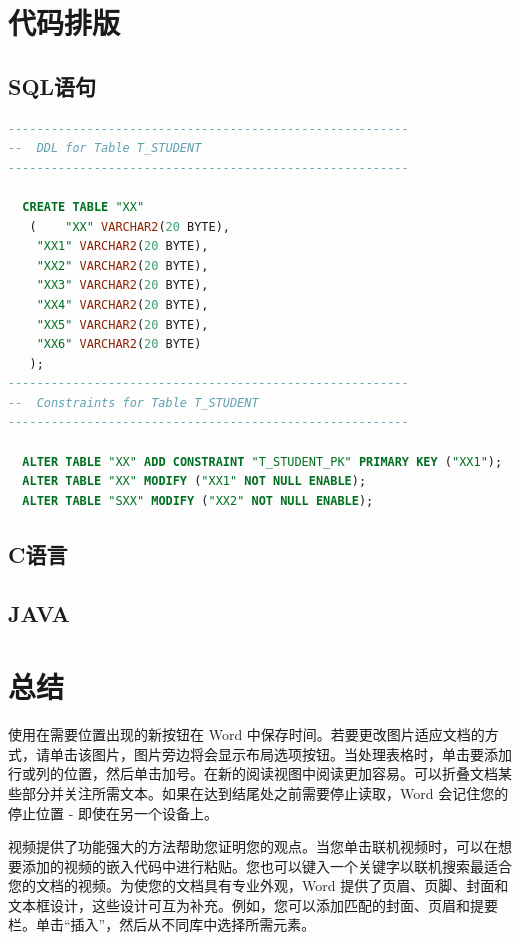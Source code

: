 \documentclass[fontset=windows]{ctexart}
\numberwithin{figure}{section}		%
\begin{document}
\section{代码排版}
\subsection{SQL语句}

\begin{lstlisting}[language=SQL]
--------------------------------------------------------
--  DDL for Table T_STUDENT
--------------------------------------------------------

  CREATE TABLE "XX" 
   (	"XX" VARCHAR2(20 BYTE), 
	"XX1" VARCHAR2(20 BYTE), 
	"XX2" VARCHAR2(20 BYTE), 
	"XX3" VARCHAR2(20 BYTE), 
	"XX4" VARCHAR2(20 BYTE), 
	"XX5" VARCHAR2(20 BYTE), 
	"XX6" VARCHAR2(20 BYTE)
   );
--------------------------------------------------------
--  Constraints for Table T_STUDENT
--------------------------------------------------------

  ALTER TABLE "XX" ADD CONSTRAINT "T_STUDENT_PK" PRIMARY KEY ("XX1");
  ALTER TABLE "XX" MODIFY ("XX1" NOT NULL ENABLE);
  ALTER TABLE "SXX" MODIFY ("XX2" NOT NULL ENABLE);

\end{lstlisting}


\subsection{C语言}

\subsection{JAVA}




\newpage
\section{总结}
使用在需要位置出现的新按钮在 Word 中保存时间。若要更改图片适应文档的方式，请单击该图片，图片旁边将会显示布局选项按钮。当处理表格时，单击要添加行或列的位置，然后单击加号。在新的阅读视图中阅读更加容易。可以折叠文档某些部分并关注所需文本。如果在达到结尾处之前需要停止读取，Word 会记住您的停止位置 - 即使在另一个设备上。
\par 视频提供了功能强大的方法帮助您证明您的观点。当您单击联机视频时，可以在想要添加的视频的嵌入代码中进行粘贴。您也可以键入一个关键字以联机搜索最适合您的文档的视频。为使您的文档具有专业外观，Word 提供了页眉、页脚、封面和文本框设计，这些设计可互为补充。例如，您可以添加匹配的封面、页眉和提要栏。单击“插入”，然后从不同库中选择所需元素。
\end{document}
